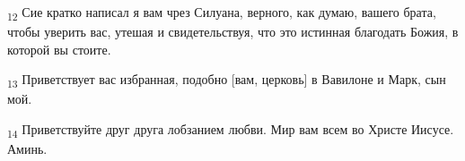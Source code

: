 \begin{tcolorbox}
\textsubscript{12} Сие кратко написал я вам чрез Силуана, верного, как думаю, вашего брата, чтобы уверить вас, утешая и свидетельствуя, что это истинная благодать Божия, в которой вы стоите.
\end{tcolorbox}
\begin{tcolorbox}
\textsubscript{13} Приветствует вас избранная, подобно [вам, церковь] в Вавилоне и Марк, сын мой.
\end{tcolorbox}
\begin{tcolorbox}
\textsubscript{14} Приветствуйте друг друга лобзанием любви. Мир вам всем во Христе Иисусе. Аминь.
\end{tcolorbox}
